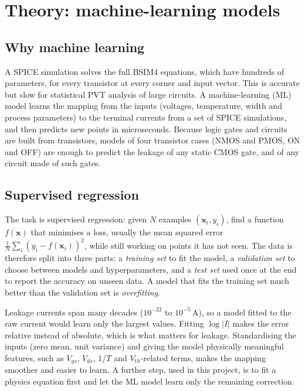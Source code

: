 \documentclass[10pt]{article}
\begin{document}
\section{Theory: machine-learning models}

\subsection*{Why machine learning}

A SPICE simulation solves the full BSIM4 equations, which have hundreds of parameters, for every
transistor at every corner and input vector. This is accurate but slow for statistical PVT analysis
of large circuits. A machine-learning (ML) model learns the mapping from the inputs (voltages,
temperature, width and process parameters) to the terminal currents from a set of SPICE
simulations, and then predicts new points in microseconds. Because logic gates and circuits are
built from transistors, models of four transistor cases (NMOS and PMOS, ON and OFF) are enough to
predict the leakage of any static CMOS gate, and of any circuit made of such gates.

\subsection*{Supervised regression}

The task is supervised regression: given $N$ examples $(\mathbf{x}_i, y_i)$, find a function
$f(\mathbf{x})$ that minimises a loss, usually the mean squared error
$\frac{1}{N}\sum_i (y_i - f(\mathbf{x}_i))^2$, while still working on points it has not seen. The
data is therefore split into three parts: a \emph{training set} to fit the model, a
\emph{validation set} to choose between models and hyperparameters, and a \emph{test set} used
once at the end to report the accuracy on unseen data. A model that fits the training set much
better than the validation set is \emph{overfitting}.

Leakage currents span many decades ($10^{-22}$ to $10^{-5}$\,A), so a model fitted to the raw
current would learn only the largest values. Fitting $\log |I|$ makes the error relative instead
of absolute, which is what matters for leakage. Standardising the inputs (zero mean, unit
variance) and giving the model physically meaningful features, such as $V_{gs}$, $V_{ds}$, $1/T$
and $V_{th}$-related terms, makes the mapping smoother and easier to learn. A further step, used in
this project, is to fit a physics equation first and let the ML model learn only the remaining
correction.
\end{document}
